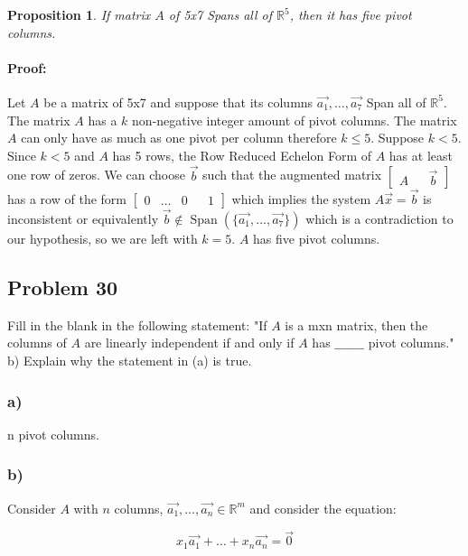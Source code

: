 \documentclass[12pt, letterpaper]{article}
\newcommand{\R}{\mathbb{R}}
\theoremstyle{statement}
\newtheorem*{atmProp}{Proposition}
\newenvironment{atmProof}{\noindent\ignorespaces\paragraph{Proof:}}{\hfill \ding{122}\par\noindent}
\begin{document}
            \begin{atmProp}
            If matrix $A$ of 5x7 Spans all of $\R^5$, then it has five pivot columns.
            \end{atmProp}
            \begin{atmProof}
            Let $A$ be a matrix of 5x7 and suppose that its columns $\vec{a_1}, \dots, \vec{a_7}$ Span all of $\R^5$. The matrix $A$ has a $k$ non-negative integer amount of pivot columns. The matrix $A$ can only have as much as one pivot per column therefore $k \leq 5$. Suppose $k < 5$. Since $k < 5$ and $A$ has 5 rows, the Row Reduced Echelon Form of $A$ has at least one row of zeros. We can choose $\vec{b}$ such that the augmented matrix $\begin{bmatrix} A && \vec{b}\end{bmatrix}$ has a row of the form $\begin{bmatrix} 0 & \dots & 0 && 1\end{bmatrix}$ which implies the system $A\vec{x} = \vec{b}$ is inconsistent or equivalently $\vec{b} \notin \operatorname{Span}(\{\vec{a_1}, \dots, \vec{a_7}\})$ which is a contradiction to our hypothesis, so we are left with $k = 5$. $A$ has five pivot columns. 
            \end{atmProof}
            
            \subsection*{Problem 30}
            Fill in the blank in the following statement: "If $A$ is a mxn matrix, then the columns of $A$ are linearly independent if and only if $A$ has $\_\_\_\_\_\_\_$ pivot columns."
            b) Explain why the statement in (a) is true.
            
            \subsubsection*{a)}
            n pivot columns.
            \subsubsection*{b)}
            Consider $A$ with $n$ columns, $\vec{a_1}, \dots, \vec{a_n} \in \R^m$ and consider the equation:
            
            \begin{equation}
                x_1\vec{a_1} + \dots + x_n\vec{a_n} = \vec{0}
                \label{eq1}
            \end{equation}
            
\end{document}

